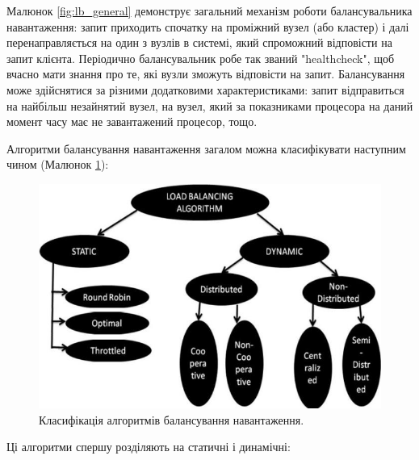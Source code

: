 \documentclass[14pt]{vakthesis}
\begin{document}
Малюнок \ref{fig:lb_general} демонструє загальний механізм роботи  балансувальника навантаження: запит приходить спочатку на проміжний вузел (або кластер) і далі  перенаправляється на один з вузлів в системі, який спроможний відповісти на запит клієнта. Періодично балансувальник робе так званий "healthcheck", щоб вчасно мати знання про те, які вузли зможуть відповісти на запит.
Балансування може здійснятися за різними додатковими характеристиками: запит відправиться на найбільш незайнятий вузел, на вузел, який за показниками процесора на даний момент часу має не завантажений процесор, тощо. 

Алгоритми балансування навантаження загалом можна класифікувати наступним чином (Малюнок \ref{fig:lb_classification}):

\begin{figure}
\centering
\includegraphics[width=\linewidth]{images/Classification-of-load-balancing-algorithms-in-cloud.png}
     \caption{Класифікація алгоритмів балансування навантаження.}
     \label{fig:lb_classification}
\end{figure}

Ці алгоритми спершу розділяють на статичні і динамічні:
\end{document}

